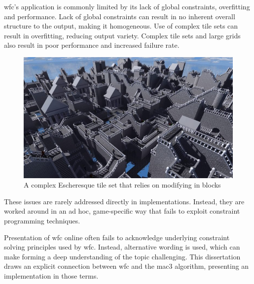 \acrshort{wfc}'s application is commonly limited by its lack of global constraints, overfitting and performance. Lack of global constraints can result in no inherent overall structure to the output, making it homogeneous. Use of complex tile sets can result in overfitting, reducing output variety. Complex tile sets and large grids also result in poor performance and increased failure rate.

\begin{figure}[H]
    \centering
    \includegraphics[width=\textwidth, height=0.3\textheight, keepaspectratio]{Images/escher_sample-768x445.jpg}
    \caption{A complex Escheresque tile set that relies on modifying in blocks \cite{model_synthesis_diss}}
    \label{fig:escheresque}
\end{figure}

These issues are rarely addressed directly in implementations. Instead, they are worked around in an ad hoc, game-specific way that fails to exploit constraint programming techniques.

Presentation of \acrshort{wfc} online often fails to acknowledge underlying constraint solving principles used by \acrshort{wfc}. Instead, alternative wording is used, which can make forming a deep understanding of the topic challenging. This dissertation draws an explicit connection between \acrshort{wfc} and the \acrfull{mac3} algorithm, presenting an implementation in those terms.

